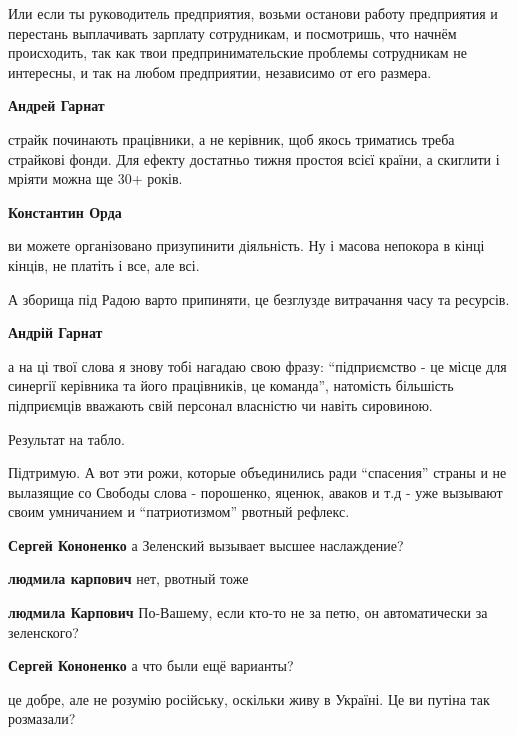 \begin{itemize}
\begin{itemize}
Или если ты руководитель предприятия, возьми останови работу предприятия и
перестань выплачивать зарплату сотрудникам, и посмотришь, что начнём
происходить, так как твои предпринимательские проблемы сотрудникам не
интересны, и так на любом предприятии, независимо от его размера.

\textbf{Андрей Гарнат} 

страйк починають працівники, а не керівник, щоб якось триматись треба страйкові
фонди. Для ефекту достатньо тижня простоя всієї країни, а скиглити і мріяти
можна ще 30+ років.

\textbf{Константин Орда} 

ви можете організовано призупинити діяльність. Ну і масова непокора в кінці
кінців, не платіть і все, але всі.

А зборища під Радою варто припиняти, це безглузде витрачання часу та ресурсів.

\textbf{Андрій Гарнат} 

а на ці твої слова я знову тобі нагадаю свою фразу: \enquote{підприємство - це місце
для синергії керівника та його працівників, це команда}, натомість більшість
підприємців вважають свій персонал власністю чи навіть сировиною.

Результат на табло.

\end{itemize} %


Підтримую. А вот эти рожи, которые объединились ради \enquote{спасения} страны и не
вылазящие со Свободы слова - порошенко, яценюк, аваков и т.д - уже вызывают
своим умничанием и \enquote{патриотизмом} рвотный рефлекс.

\begin{itemize} %
\textbf{Сергей Кононенко} а Зеленский вызывает высшее наслаждение?

\textbf{людмила карпович} нет, рвотный тоже

\textbf{людмила Карпович} По-Вашему, если кто-то не за петю, он автоматически за зеленского?

\textbf{Сергей Кононенко} а что были ещё варианты?
\end{itemize} %

це добре, але не розумію російську, оскільки живу в Україні. Це ви путіна так розмазали?


\end{itemize}
